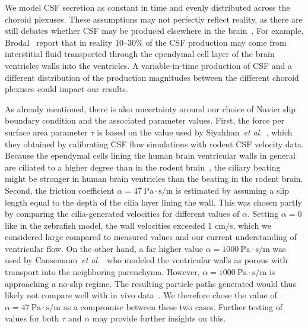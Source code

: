\documentclass{template}
\begin{document}
We model CSF secretion as constant in time and evenly distributed
across the choroid plexuses. These assumptions may not perfectly reflect
reality, as there are still debates whether CSF may be produced
elsewhere in the brain~\cite{miyajima2015evaluation}.
For example, Brodal~\cite{Brodal2016TheSystem}
report that in reality 10--30\% of the CSF production
may come from interstitial fluid transported through the ependymal cell
layer of the brain ventricles walls into the ventricles.
A variable-in-time production of CSF and a different distribution of the production
magnitudes between the different choroid plexuses could impact our results. 

As already mentioned, there is also uncertainty around our choice
of Navier slip boundary condition and the associated parameter values.
First, the force per surface area parameter $\tau$ is based on the value used by
Siyahhan~\emph{et al.}~\cite{Siyahhan2014FlowVentricles}, which they obtained by
calibrating CSF flow simulations with rodent CSF velocity data. Because the
ependymal cells lining the human brain ventricular walls
in general are ciliated to a higher degree than in the rodent brain~\cite{spassky2017development},
the ciliary beating might be stronger in human brain ventricles
than the beating in the rodent brain. Second,
the friction coefficient $\alpha=47 \ \mathrm{Pa\cdot s/m}$
is estimated by assuming a slip length equal to the depth of the cilia layer lining
the wall. This was chosen partly by comparing the cilia-generated velocities for
different values of $\alpha$. Setting $\alpha=0$ like in the zebrafish model,
the wall velocities exceeded 1 cm/s, which we considered large compared to measured
values and our current understanding of ventricular flow.
On the other hand, a far higher value $\alpha=1000 \ \mathrm{Pa\cdot s/m}$
was used by Causemann~\emph{et al.}~\cite{Causemann2022HumanFramework}
who modeled the ventricular walls as porous with transport into the neighboring
parenchyma. However, $\alpha=1000 \ \mathrm{Pa\cdot s/m}$
is approaching a no-slip regime. The resulting
particle paths generated would thus likely not compare well with
in vivo data~\cite{stadlbauer2010insight}. We therefore
chose the value of $\alpha=47 \ \mathrm{Pa\cdot s/m}$ as a 
compromise between these two cases. Further testing of values for
both $\tau$ and $\alpha$ may provide further insights on this.
\end{document}
